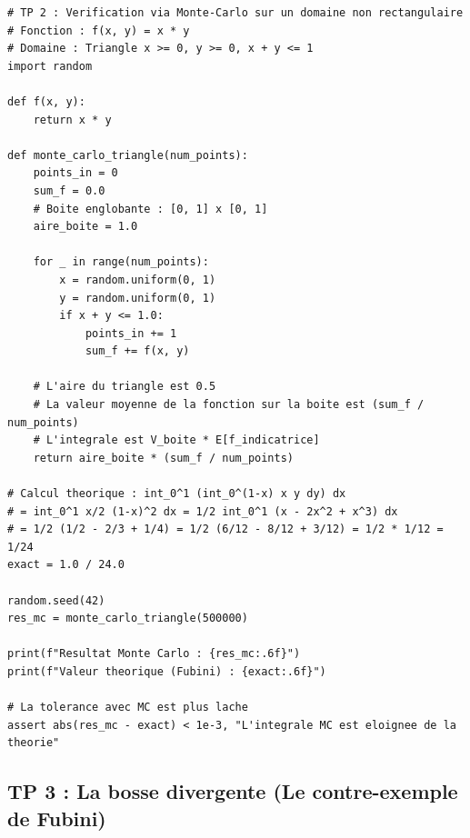 \documentclass[11pt,a4paper]{article}
\begin{document}
\begin{lstlisting}
# TP 2 : Verification via Monte-Carlo sur un domaine non rectangulaire
# Fonction : f(x, y) = x * y
# Domaine : Triangle x >= 0, y >= 0, x + y <= 1
import random

def f(x, y):
    return x * y

def monte_carlo_triangle(num_points):
    points_in = 0
    sum_f = 0.0
    # Boite englobante : [0, 1] x [0, 1]
    aire_boite = 1.0

    for _ in range(num_points):
        x = random.uniform(0, 1)
        y = random.uniform(0, 1)
        if x + y <= 1.0:
            points_in += 1
            sum_f += f(x, y)

    # L'aire du triangle est 0.5
    # La valeur moyenne de la fonction sur la boite est (sum_f / num_points)
    # L'integrale est V_boite * E[f_indicatrice]
    return aire_boite * (sum_f / num_points)

# Calcul theorique : int_0^1 (int_0^(1-x) x y dy) dx
# = int_0^1 x/2 (1-x)^2 dx = 1/2 int_0^1 (x - 2x^2 + x^3) dx
# = 1/2 (1/2 - 2/3 + 1/4) = 1/2 (6/12 - 8/12 + 3/12) = 1/2 * 1/12 = 1/24
exact = 1.0 / 24.0

random.seed(42)
res_mc = monte_carlo_triangle(500000)

print(f"Resultat Monte Carlo : {res_mc:.6f}")
print(f"Valeur theorique (Fubini) : {exact:.6f}")

# La tolerance avec MC est plus lache
assert abs(res_mc - exact) < 1e-3, "L'integrale MC est eloignee de la theorie"
\end{lstlisting}


\subsection*{TP 3 : La bosse divergente (Le contre-exemple de Fubini)}
\end{document}
